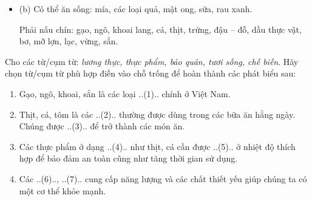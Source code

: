 \documentclass[Main.tex]{subfiles}
\begin{document}
\begin{bt}
{\begin{itemize}
			Nguồn gốc từ động vật: mật ong, cá, thịt, trứng, mỡ lợn, sữa.
			\item (b) Có thể ăn sống: mía, các loại quả, mật ong, sữa, rau xanh.

			Phải nấu chín: gạo, ngô, khoai lang, cá, thịt, trứng, đậu -- đỗ, dầu thực vật, bơ, mỡ lợn, lạc, vừng, sắn.
		\end{itemize}
	}
\end{bt}

\begin{bt}%
	Cho các từ/cụm từ: \textit{lương thực, thực phẩm, bảo quản, tươi sống, chế biến}. Hãy chọn từ/cụm từ phù hợp điền vào chỗ trống để hoàn thành các phát biểu sau:
	\begin{enumerate}
		\item[(a)] Gạo, ngô, khoai, sắn là các loại ..(1).. chính ở Việt Nam.
		\item[(b)] Thịt, cá, tôm là các ..(2).. thường được dùng trong các bữa ăn hằng ngày. Chúng được ..(3).. để trở thành các món ăn.
		\item[(c)] Các thực phẩm ở dạng ..(4).. như thịt, cá cần được ..(5).. ở nhiệt độ thích hợp để bảo đảm an toàn cũng như tăng thời gian sử dụng.
		\item[(d)] Các ..(6).., ..(7).. cung cấp năng lượng và các chất thiết yếu giúp chúng ta có một cơ thể khỏe mạnh.
	\end{enumerate}
\end{bt}
\end{document}
